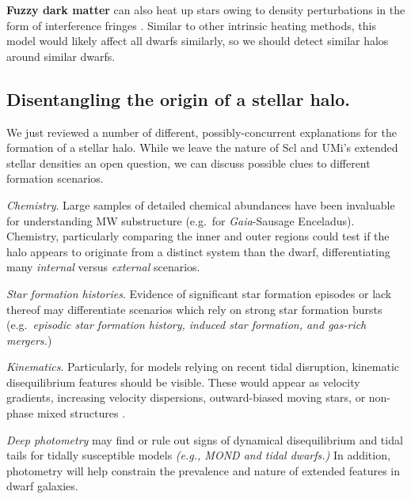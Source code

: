\textbf{Fuzzy dark matter} can also heat up stars owing to density
perturbations in the form of interference fringes
\citep[e.g.,][]{el-zant+2020, duttachowdhury+2023}. Similar to other
intrinsic heating methods, this model would likely affect all dwarfs
similarly, so we should detect similar halos around similar dwarfs.

\subsection{Disentangling the origin of a stellar
halo.}\label{disentangling-the-origin-of-a-stellar-halo.}

We just reviewed a number of different, possibly-concurrent explanations
for the formation of a stellar halo. While we leave the nature of Scl
and UMi's extended stellar densities an open question, we can discuss
possible clues to different formation scenarios.

\emph{Chemistry}. Large samples of detailed chemical abundances have
been invaluable for understanding MW substructure (e.g.~for
\emph{Gaia}-Sausage Enceladus). Chemistry, particularly comparing the
inner and outer regions could test if the halo appears to originate from
a distinct system than the dwarf, differentiating many \emph{internal}
versus \emph{external} scenarios.

\emph{Star formation histories}. Evidence of significant star formation
episodes or lack thereof may differentiate scenarios which rely on
strong star formation bursts (e.g.~\emph{episodic star formation
history, induced star formation, and gas-rich mergers.})

\emph{Kinematics}. Particularly, for models relying on recent tidal
disruption, kinematic disequilibrium features should be visible. These
would appear as velocity gradients, increasing velocity dispersions,
outward-biased moving stars, or non-phase mixed structures
\citep[e.g,][]{kroupa1997, read+2006, sanchez-salcedo+hernandez2007}.

\emph{Deep photometry} may find or rule out signs of dynamical
disequilibrium and tidal tails for tidally susceptible models
\emph{(e.g., MOND and tidal dwarfs.)} In addition, photometry will help
constrain the prevalence and nature of extended features in dwarf
galaxies.

